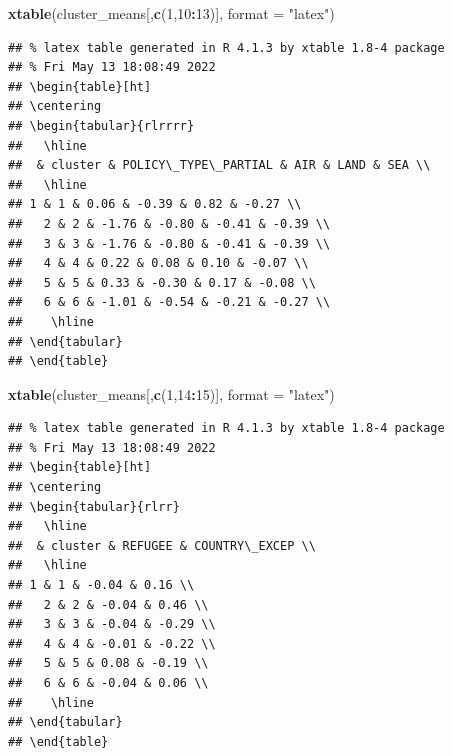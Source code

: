 \documentclass[]{article}
\newenvironment{Shaded}{\begin{snugshade}}{\end{snugshade}}
\newcommand{\DataTypeTok}[1]{\textcolor[rgb]{0.13,0.29,0.53}{#1}}
\newcommand{\DecValTok}[1]{\textcolor[rgb]{0.00,0.00,0.81}{#1}}
\newcommand{\KeywordTok}[1]{\textcolor[rgb]{0.13,0.29,0.53}{\textbf{#1}}}
\newcommand{\NormalTok}[1]{#1}
\newcommand{\OperatorTok}[1]{\textcolor[rgb]{0.81,0.36,0.00}{\textbf{#1}}}
\newcommand{\StringTok}[1]{\textcolor[rgb]{0.31,0.60,0.02}{#1}}
\begin{document}
\begin{Shaded}
\begin{Highlighting}[]
\KeywordTok{xtable}\NormalTok{(cluster_means[,}\KeywordTok{c}\NormalTok{(}\DecValTok{1}\NormalTok{,}\DecValTok{10}\OperatorTok{:}\DecValTok{13}\NormalTok{)], }\DataTypeTok{format =} \StringTok{"latex"}\NormalTok{)}
\end{Highlighting}
\end{Shaded}

\begin{verbatim}
## % latex table generated in R 4.1.3 by xtable 1.8-4 package
## % Fri May 13 18:08:49 2022
## \begin{table}[ht]
## \centering
## \begin{tabular}{rlrrrr}
##   \hline
##  & cluster & POLICY\_TYPE\_PARTIAL & AIR & LAND & SEA \\ 
##   \hline
## 1 & 1 & 0.06 & -0.39 & 0.82 & -0.27 \\ 
##   2 & 2 & -1.76 & -0.80 & -0.41 & -0.39 \\ 
##   3 & 3 & -1.76 & -0.80 & -0.41 & -0.39 \\ 
##   4 & 4 & 0.22 & 0.08 & 0.10 & -0.07 \\ 
##   5 & 5 & 0.33 & -0.30 & 0.17 & -0.08 \\ 
##   6 & 6 & -1.01 & -0.54 & -0.21 & -0.27 \\ 
##    \hline
## \end{tabular}
## \end{table}
\end{verbatim}

\begin{Shaded}
\begin{Highlighting}[]
\KeywordTok{xtable}\NormalTok{(cluster_means[,}\KeywordTok{c}\NormalTok{(}\DecValTok{1}\NormalTok{,}\DecValTok{14}\OperatorTok{:}\DecValTok{15}\NormalTok{)], }\DataTypeTok{format =} \StringTok{"latex"}\NormalTok{)}
\end{Highlighting}
\end{Shaded}

\begin{verbatim}
## % latex table generated in R 4.1.3 by xtable 1.8-4 package
## % Fri May 13 18:08:49 2022
## \begin{table}[ht]
## \centering
## \begin{tabular}{rlrr}
##   \hline
##  & cluster & REFUGEE & COUNTRY\_EXCEP \\ 
##   \hline
## 1 & 1 & -0.04 & 0.16 \\ 
##   2 & 2 & -0.04 & 0.46 \\ 
##   3 & 3 & -0.04 & -0.29 \\ 
##   4 & 4 & -0.01 & -0.22 \\ 
##   5 & 5 & 0.08 & -0.19 \\ 
##   6 & 6 & -0.04 & 0.06 \\ 
##    \hline
## \end{tabular}
## \end{table}
\end{verbatim}
\end{document}
